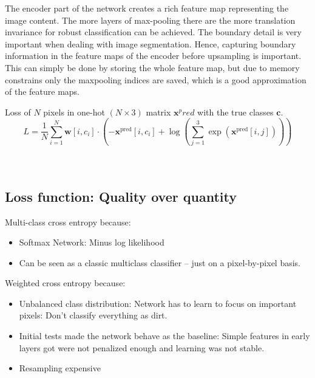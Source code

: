 \documentclass[12pt,fleqn]{article}
\begin{document}
The encoder part of the network creates a rich feature map representing the image content. The more 
layers of max-pooling there are the more translation invariance for robust 
classification can be achieved. The boundary detail is very important when 
dealing with image segmentation. Hence, capturing boundary information in 
the feature maps of the encoder before upsampling is important. This can 
simply be done by storing the whole feature map, but due to memory 
constrains only the maxpooling indices are saved, which is a good 
approximation of the feature maps. 


Loss of \(N\) pixels in one-hot \((N \times  3)\) matrix \(\mathbf x^pred\) with the true classes \(\mathbf c\).
\[
L = \frac 1 N \sum_{i=1}^{N} \mathbf{w}[i, c_i]  \cdot 
\left( 
-\mathbf x^\text{pred}[i, c_i] + \log
\left(
\sum_{j=1}^{3}\exp(\mathbf x^\text{pred}[i, j])
\right)
\right)
\]
\\
\\
\subsection{Loss function: Quality over quantity}
Multi-class cross entropy because:
\begin{itemize}
	\item Softmax Network: Minus log likelihood
	\item Can be seen as a classic multiclass classifier -- just on a pixel-by-pixel basis.
\end{itemize}
Weighted cross entropy because:
\begin{itemize}
	\item Unbalanced class distribution: Network has to learn to focus on important pixels: Don't classify everything as dirt.
	\item Initial tests made the network behave as the baseline: Simple features in early layers got were not penalized enough and learning was not stable.
	\item Resampling expensive
\end{itemize}
\end{document}

